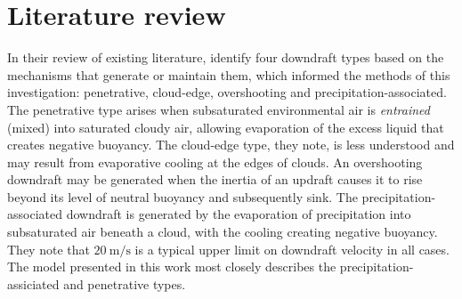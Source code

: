 \documentclass[12pt,titlepage]{article}
\begin{document}
\section{Literature review}

In their review of existing literature,
\textcite{knupp_cotton_1985} identify four downdraft types based
on the mechanisms that generate or maintain them, which
informed the methods of this investigation: penetrative, cloud-edge,
overshooting and precipitation-associated.
The penetrative type arises when subsaturated environmental air
is \emph{entrained} (mixed) into saturated cloudy air, allowing
evaporation of the excess liquid that creates negative buoyancy.
The cloud-edge type, they note, is less understood and may result
from evaporative cooling at the edges of clouds.
An overshooting downdraft may be generated when the inertia of
an updraft causes it to rise beyond its level of neutral buoyancy
and subsequently sink.
The precipitation-associated downdraft is generated by the evaporation
of precipitation into subsaturated air beneath a cloud, with the cooling
creating negative buoyancy. They note that $\SI{20}{\meter \per\second}$
is a typical upper limit on downdraft velocity in all cases. The model
presented in
this work most closely describes the precipitation-assiciated and
penetrative types.
\end{document}
